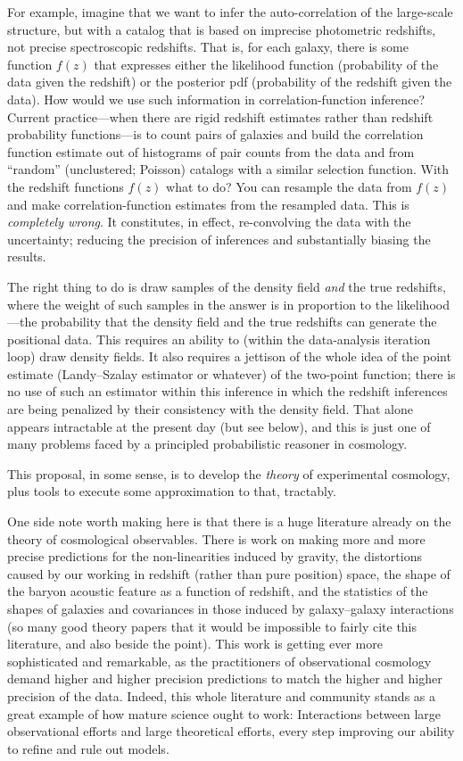 \documentclass[12pt]{article}
\begin{document}
For example, imagine that we want to infer the auto-correlation of the
large-scale structure, but with a catalog that is based on imprecise
photometric redshifts, not precise spectroscopic redshifts.
That is, for each galaxy, there is some function $f(z)$ that expresses
either the likelihood function (probability of the data given the
redshift) or the posterior pdf (probability of the redshift given the
data).
How would we use such information in correlation-function inference?
Current practice---when there are rigid redshift estimates rather than
redshift probability functions---is to count pairs of galaxies and
build the correlation function estimate out of histograms of pair
counts from the data and from ``random'' (unclustered; Poisson)
catalogs with a similar selection function.
With the redshift functions $f(z)$ what to do?
You can resample the data from $f(z)$ and make correlation-function
estimates from the resampled data.
This is \emph{completely wrong}.
It constitutes, in effect, re-convolving the data with the
uncertainty; reducing the precision of inferences and substantially
biasing the results.

The right thing to do is draw samples of the density field \emph{and}
the true redshifts, where the weight of such samples in the answer is
in proportion to the likelihood---the probability that the density
field and the true redshifts can generate the positional data.
This requires an ability to (within the data-analysis iteration loop)
draw density fields.
It also requires a jettison of the whole idea of the point estimate
(Landy--Szalay estimator or whatever) of the two-point function; there
is no use of such an estimator within this inference in which the
redshift inferences are being penalized by their consistency with the
density field.
That alone appears intractable at the present day (but see below), and
this is just one of many problems faced by a principled probabilistic
reasoner in cosmology.

This proposal, in some sense, is to develop the \emph{theory} of
experimental cosmology, plus tools to execute some approximation
to that, tractably.

One side note worth making here is that there is a huge literature
already on the theory of cosmological observables.
There is work on making more and more precise predictions for the
non-linearities induced by gravity, the distortions caused by our
working in redshift (rather than pure position) space, the shape of
the baryon acoustic feature as a function of redshift, and the
statistics of the shapes of galaxies and covariances in those induced
by galaxy--galaxy interactions (so many good theory papers that it
would be impossible to fairly cite this literature, and also beside
the point).
This work is getting ever more sophisticated and remarkable, as the
practitioners of observational cosmology demand higher and higher
precision predictions to match the higher and higher precision of the
data.
Indeed, this whole literature and community stands as a great example
of how mature science ought to work:
Interactions between large observational efforts and large theoretical
efforts, every step improving our ability to refine and rule out
models.
\end{document}
